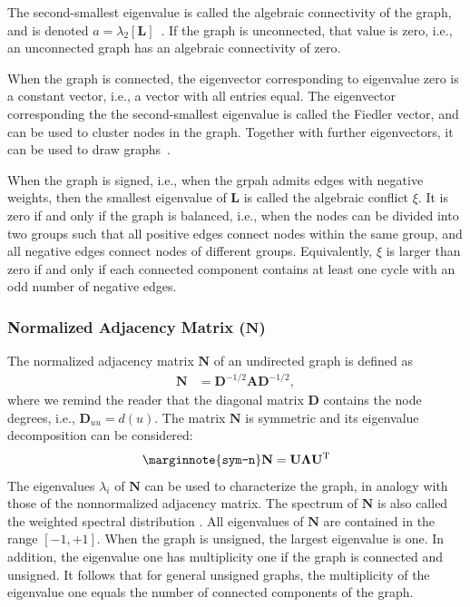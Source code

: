 \documentclass{article}
\begin{document}
The second-smallest eigenvalue is called the algebraic connectivity of
the graph, and is denoted $a = \lambda_2[\mathbf L]$~\cite{b652}.  If the graph is
unconnected, that value is zero, i.e., an unconnected graph has an
algebraic connectivity of zero. 

When the graph is connected, the eigenvector corresponding to eigenvalue
zero is a constant vector, i.e., a vector with all entries equal. The
eigenvector corresponding the the second-smallest eigenvalue is called
the Fiedler vector, and can be used to cluster nodes in the
graph. Together with further eigenvectors, it can be used to draw
graphs~\cite{kunegis:signed-kernels}. 

When the graph is signed, i.e., when the grpah admits edges with
negative weights, then the smallest eigenvalue of $\mathbf L$ is called
the algebraic conflict $\xi$. It is zero if and only if the graph is balanced,
i.e., when the nodes can be divided into two groups such that all
positive edges connect nodes within the same group, and all negative
edges connect nodes of different groups.  Equivalently, $\xi$ is larger
than zero if and only if each connected component contains at least one
cycle with an odd number of negative edges. 

\subsubsection{Normalized Adjacency Matrix ($\mathbf N$)}
The normalized adjacency matrix $\mathbf N$ of an undirected graph is
defined as 
\begin{align*}
  \mathbf N &= \mathbf D^{-1/2} \mathbf A \mathbf D^{-1/2},
\end{align*}
where we remind the reader that the diagonal matrix $\mathbf D$
contains the node degrees, i.e., $\mathbf D_{uu} = d(u)$. 
The matrix $\mathbf N$ is symmetric and its eigenvalue decomposition can
be considered:
\begin{align}
  \marginnote{\texttt{sym-n}}
  \mathbf N = \mathbf U \mathbf \Lambda \mathbf U^{\mathrm T}
\end{align}
The eigenvalues $\lambda_i$ of $\mathbf N$ can be used to characterize
the graph, in analogy with those of the nonnormalized adjacency
matrix.
The spectrum of $\mathbf N$ is also called the weighted spectral
distribution \cite{b864}.
All eigenvalues of $\mathbf N$ are contained in the range
$[-1,+1]$.  When the graph is unsigned, the largest eigenvalue is one.
In addition, the eigenvalue one has multiplicity one if the graph is
connected and unsigned.  It follows that for general unsigned graphs,
the multiplicity of the eigenvalue one equals the number of connected
components of the graph. 
\end{document}
